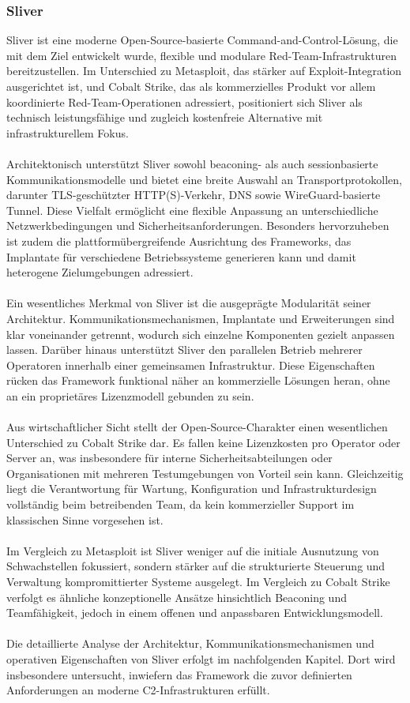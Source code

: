\subsubsection{Sliver}
Sliver ist eine moderne Open-Source-basierte Command-and-Control-Lösung, die mit dem Ziel entwickelt wurde, flexible und modulare Red-Team-Infrastrukturen bereitzustellen. 
Im Unterschied zu Metasploit, das stärker auf Exploit-Integration ausgerichtet ist, und Cobalt Strike, das als kommerzielles Produkt vor allem koordinierte Red-Team-Operationen adressiert, positioniert sich Sliver als technisch leistungsfähige und zugleich kostenfreie Alternative mit infrastrukturellem Fokus.
\\\\
Architektonisch unterstützt Sliver sowohl beaconing- als auch sessionbasierte Kommunikationsmodelle und bietet eine breite Auswahl an Transportprotokollen, darunter TLS-geschützter HTTP(S)-Verkehr, DNS sowie WireGuard-basierte Tunnel. 
Diese Vielfalt ermöglicht eine flexible Anpassung an unterschiedliche Netzwerkbedingungen und Sicherheitsanforderungen. 
Besonders hervorzuheben ist zudem die plattformübergreifende Ausrichtung des Frameworks, das Implantate für verschiedene Betriebssysteme generieren kann und damit heterogene Zielumgebungen adressiert.
\\\\
Ein wesentliches Merkmal von Sliver ist die ausgeprägte Modularität seiner Architektur. 
Kommunikationsmechanismen, Implantate und Erweiterungen sind klar voneinander getrennt, wodurch sich einzelne Komponenten gezielt anpassen lassen. 
Darüber hinaus unterstützt Sliver den parallelen Betrieb mehrerer Operatoren innerhalb einer gemeinsamen Infrastruktur. 
Diese Eigenschaften rücken das Framework funktional näher an kommerzielle Lösungen heran, ohne an ein proprietäres Lizenzmodell gebunden zu sein.
\\\\
Aus wirtschaftlicher Sicht stellt der Open-Source-Charakter einen wesentlichen Unterschied zu Cobalt Strike dar. 
Es fallen keine Lizenzkosten pro Operator oder Server an, was insbesondere für interne Sicherheitsabteilungen oder Organisationen mit mehreren Testumgebungen von Vorteil sein kann. 
Gleichzeitig liegt die Verantwortung für Wartung, Konfiguration und Infrastrukturdesign vollständig beim betreibenden Team, da kein kommerzieller Support im klassischen Sinne vorgesehen ist.
\\\\
Im Vergleich zu Metasploit ist Sliver weniger auf die initiale Ausnutzung von Schwachstellen fokussiert, sondern stärker auf die strukturierte Steuerung und Verwaltung kompromittierter Systeme ausgelegt. 
Im Vergleich zu Cobalt Strike verfolgt es ähnliche konzeptionelle Ansätze hinsichtlich Beaconing und Teamfähigkeit, jedoch in einem offenen und anpassbaren Entwicklungsmodell.
\\\\
Die detaillierte Analyse der Architektur, Kommunikationsmechanismen und operativen Eigenschaften von Sliver erfolgt im nachfolgenden Kapitel. 
Dort wird insbesondere untersucht, inwiefern das Framework die zuvor definierten Anforderungen an moderne C2-Infrastrukturen erfüllt.